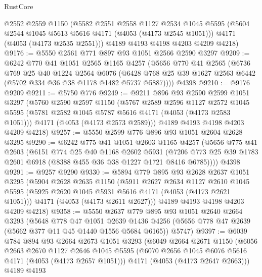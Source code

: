 \begin{lexlean}{RustCore}
\begin{coremodule}
      @2552
      @2559
      @1150
      (@5582
        @2551
        @2558
        @1127
        @2534
        @1045
        @5595
        (@5604 @2544 @1045 @5613 @5616 @4171 (@4053 (@4173 @2545 @1051)))
        @4171
        (@4053 (@4173 @2535 @2551)))
      @4189
      @4193
      @4198
      @4203
      @4209
      @4218)
@9176 := @5550 @2561 @771 @897 @93 @1051 @2566 @2590 @3297
@9209 := @6242
    @770
    @41
    @1051
    @2565
    @1165
    @4257
    (@5656
      @770
      @41
      @2565
      (@6736
        @769
        @25
        @40
        @1224
        @2564
        @6076
        (@6428 @768 @25 @39 @1627 @2563 @6442 (@5702 @334 @36 @38 @1178 @1482 @5737 @5887))))
    @4398
@9210 := @9176 @9209
@9211 := @5750 @776
@9249 := @9211
    @896
    @93
    @2590
    @2599
    @1051
    @3297
    (@5760
      @2590
      @2597
      @1150
      (@5767
        @2589
        @2596
        @1127
        @2572
        @1045
        @5595
        (@5781 @2582 @1045 @5787 @5616 @4171 (@4053 (@4173 @2583 @1051)))
        @4171
        (@4053 (@4173 @2573 @2589)))
      @4189
      @4193
      @4198
      @4203
      @4209
      @4218)
@9257 := @5550 @2599 @776 @896 @93 @1051 @2604 @2628 @3295
@9290 := @6242
    @775
    @41
    @1051
    @2603
    @1165
    @4257
    (@5656
      @775
      @41
      @2603
      (@6151
        @774
        @25
        @40
        @1168
        @2602
        @5931
        (@7206 @773 @25 @39 @1783 @2601 @6918 (@8388 @455 @36 @38 @1227 @1721 @8416 @6785))))
    @4398
@9291 := @9257 @9290
@9330 := @5894
    @779
    @895
    @93
    @2628
    @2637
    @1051
    @3295
    (@5904
      @2628
      @2635
      @1150
      (@5911
        @2627
        @2634
        @1127
        @2610
        @1045
        @5595
        (@5925 @2620 @1045 @5931 @5616 @4171 (@4053 (@4173 @2621 @1051)))
        @4171
        (@4053 (@4173 @2611 @2627)))
      @4189
      @4193
      @4198
      @4203
      @4209
      @4218)
@9358 := @5550
    @2637
    @779
    @895
    @93
    @1051
    @2640
    @2664
    @3293
    (@5648
      @778
      @47
      @1051
      @2639
      @1436
      @4256
      (@5656 @778 @47 @2639 (@5662 @377 @11 @45 @1440 @1556 @5684 @6165))
      @5747)
@9397 := @6039
    @784
    @894
    @93
    @2664
    @2673
    @1051
    @3293
    (@6049
      @2664
      @2671
      @1150
      (@6056
        @2663
        @2670
        @1127
        @2646
        @1045
        @5595
        (@6070 @2656 @1045 @6076 @5616 @4171 (@4053 (@4173 @2657 @1051)))
        @4171
        (@4053 (@4173 @2647 @2663)))
      @4189
      @4193

\end{coremodule}
\end{lexlean}
